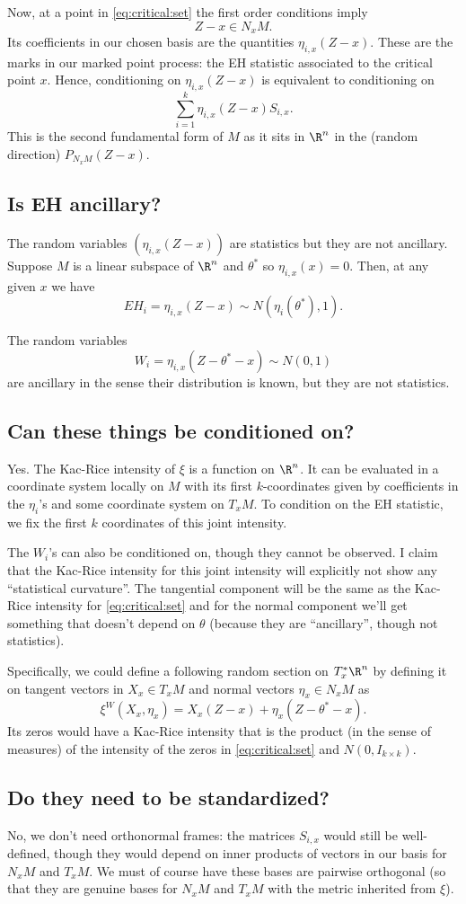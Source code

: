 \documentclass{article}
\begin{document}
Now, at a point in \eqref{eq:critical:set} the first order conditions imply
$$
Z-x \in N_xM.
$$
Its coefficients in our chosen basis are the quantities $\eta_{i,x}(Z-x)$. These are the marks
in our marked point process: the EH statistic associated to the critical point $x$. Hence, conditioning on $\eta_{i,x}(Z-x)$ is equivalent to conditioning on 
$$
\sum_{i=1}^k \eta_{i,x}(Z-x) S_{i,x}.
$$
This is the second fundamental form of $M$ as it sits in $\R^n$ in the (random direction) $P_{N_xM}(Z-x)$.

\subsection{Is EH ancillary?}

The random variables $(\eta_{i,x}(Z-x))$ are statistics but they are not ancillary.
Suppose $M$ is a linear subspace of $\R^n$ and $\theta^*$ so $\eta_{i,x}(x)=0$.
Then, at any given $x$ we have
$$
EH_i = \eta_{i,x}(Z-x) \sim N(\eta_i(\theta^*), 1).
$$

The random variables
$$
W_i = \eta_{i,x}(Z-\theta^*-x) \sim N(0, 1)
$$
are ancillary in the sense their distribution is known, but they are not statistics.

\subsection{Can these things be conditioned on?}

Yes. The Kac-Rice intensity of $\xi$ is a function on $\R^n$. It can be evaluated in
a coordinate system locally on $M$ with its first $k$-coordinates given by coefficients
in the $\eta_i$'s and some coordinate system on $T_xM$. To condition on the
EH statistic, we fix the first $k$ coordinates of this joint intensity.

The $W_i$'s can also be conditioned on, though they cannot be observed. I claim that
the Kac-Rice intensity for this joint intensity will explicitly not show any ``statistical curvature''. The tangential component will be the same as the Kac-Rice intensity for
\eqref{eq:critical:set} and for the normal component we'll get something
that doesn't depend on $\theta$ (because they are ``ancillary'', though not statistics).

Specifically, we could define a following random section on $T_x^*\R^n$ by defining
it on tangent vectors in $X_x \in T_xM$ and normal vectors $\eta_x \in N_xM$ as
$$\xi^W\left(X_x,\eta_x\right) = X_x(Z-x) + \eta_x(Z-\theta^*-x).
$$
Its zeros would have a Kac-Rice intensity that is the product (in the sense of measures)
of the intensity of the zeros in \eqref{eq:critical:set} and $N(0,I_{k \times k})$.

\subsection{Do they need to be standardized?}

No, we don't need orthonormal frames: the matrices $S_{i,x}$ would still be well-defined, though they would depend on inner products of vectors in our basis for $N_xM$ and $T_xM$. We must of course have these bases are pairwise orthogonal (so that they are genuine bases for $N_xM$ and $T_xM$ with the metric inherited from $\xi$).
\end{document}
